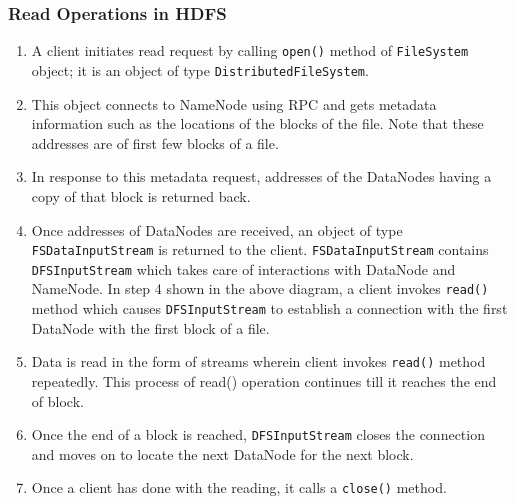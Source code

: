\documentclass{article}
\begin{document}
\subsubsection{Read Operations in HDFS}
\begin{enumerate}
    \item A client initiates read request by calling \verb|open()| method of \texttt{FileSystem} object; it is an object of type \texttt{DistributedFileSystem}.
    \item This object connects to NameNode using RPC and gets metadata information such as the locations of the blocks of the file. Note that these addresses are of first few blocks of a file.
    \item In response to this metadata request, addresses of the DataNodes having a copy of that block is returned back.
    \item Once addresses of DataNodes are received, an object of type \texttt{FSDataInputStream} is returned to the client. \texttt{FSDataInputStream} contains \texttt{DFSInputStream} which takes care of interactions with DataNode and NameNode. In step 4 shown in the above diagram, a client invokes \verb|read()| method which causes \texttt{DFSInputStream} to establish a connection with the first DataNode with the first block of a file.
    \item Data is read in the form of streams wherein client invokes \verb|read()| method repeatedly. This process of read() operation continues till it reaches the end of block.
    \item Once the end of a block is reached, \texttt{DFSInputStream} closes the connection and moves on to locate the next DataNode for the next block.
    \item Once a client has done with the reading, it calls a \verb|close()| method.
\end{enumerate}
\end{document}
